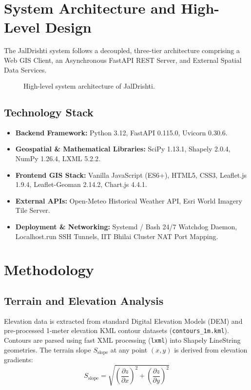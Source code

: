 \documentclass[manuscript,screen,review]{acmart}
\begin{document}
\section{System Architecture and High-Level Design}
\label{sec:architecture}
The JalDrishti system follows a decoupled, three-tier architecture comprising a Web GIS Client, an Asynchronous FastAPI REST Server, and External Spatial Data Services.

\begin{figure}[h]
  \centering
  \caption{High-level system architecture of JalDrishti.}
  \label{fig:architecture}
\end{figure}

\subsection{Technology Stack}
\begin{itemize}
    \item \textbf{Backend Framework:} Python 3.12, FastAPI 0.115.0, Uvicorn 0.30.6.
    \item \textbf{Geospatial \& Mathematical Libraries:} SciPy 1.13.1, Shapely 2.0.4, NumPy 1.26.4, LXML 5.2.2.
    \item \textbf{Frontend GIS Stack:} Vanilla JavaScript (ES6+), HTML5, CSS3, Leaflet.js 1.9.4, Leaflet-Geoman 2.14.2, Chart.js 4.4.1.
    \item \textbf{External APIs:} Open-Meteo Historical Weather API, Esri World Imagery Tile Server.
    \item \textbf{Deployment \& Networking:} Systemd / Bash 24/7 Watchdog Daemon, Localhost.run SSH Tunnels, IIT Bhilai Cluster NAT Port Mapping.
\end{itemize}

\section{Methodology}
\label{sec:methodology}

\subsection{Terrain and Elevation Analysis}
Elevation data is extracted from standard Digital Elevation Models (DEM) and pre-processed 1-meter elevation KML contour datasets (\texttt{contours\_1m.kml}). Contours are parsed using fast XML processing (\texttt{lxml}) into Shapely LineString geometries. The terrain slope $S_{\text{slope}}$ at any point $(x,y)$ is derived from elevation gradients:
\begin{equation}
S_{\text{slope}} = \sqrt{\left(\frac{\partial z}{\partial x}\right)^2 + \left(\frac{\partial z}{\partial y}\right)^2}
\end{equation}
\end{document}
